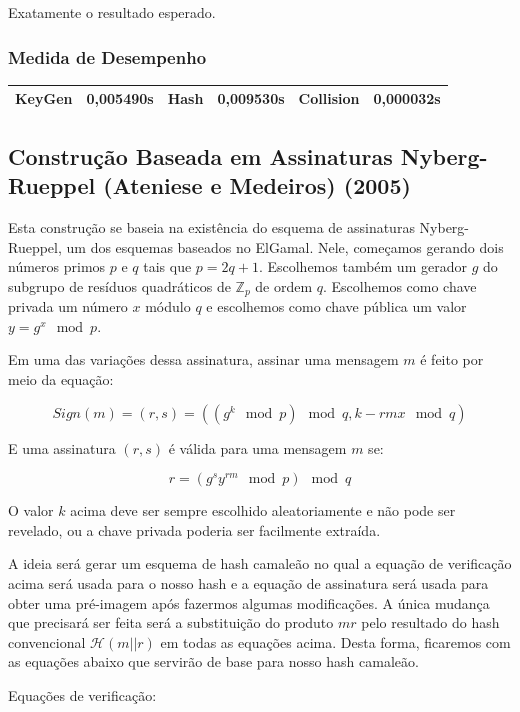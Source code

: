 \documentclass[a4paper]{article}
\begin{document}
Exatamente o resultado esperado.

\subsubsection{Medida de Desempenho}

\begin{center}
\begin{tabular}{|c|c|c|c|c|c|}
  \hline
  KeyGen & 0,005490s & Hash & 0,009530s & Collision & 0,000032s\\
  \hline
\end{tabular}
\end{center}

\subsection{Construção Baseada em Assinaturas  Nyberg-Rueppel
  (Ateniese e Medeiros) (2005)\cite{ateniese}}

Esta construção se baseia na existência do esquema de assinaturas
Nyberg-Rueppel, um dos esquemas baseados no ElGamal. Nele, começamos
gerando dois números primos $p$ e $q$ tais que $p=2q+1$. Escolhemos
também um gerador $g$ do subgrupo de resíduos quadráticos de
$\mathbb{Z}_p$ de ordem $q$. Escolhemos como chave privada um número
$x$ módulo $q$ e escolhemos como chave pública um valor $y=g^x \mod
p$.

Em uma das variações dessa assinatura, assinar uma mensagem $m$ é
feito por meio da equação:

$$
Sign(m) = (r, s) = ((g^k \mod p) \mod q, k-rmx \mod q)
$$

E uma assinatura $(r, s)$ é válida para uma mensagem $m$ se:

$$
r = (g^sy^{rm} \mod p) \mod q
$$

O valor $k$ acima deve ser sempre escolhido aleatoriamente e não pode
ser revelado, ou a chave privada poderia ser facilmente extraída.

A ideia será gerar um esquema de hash camaleão no qual a equação de
verificação acima será usada para o nosso hash e a equação de
assinatura será usada para obter uma pré-imagem após fazermos algumas
modificações. A única mudança que precisará ser feita será a
substituição do produto $mr$ pelo resultado do hash convencional
$\mathcal{H}(m||r)$ em todas as equações acima. Desta forma, ficaremos
com as equações abaixo que servirão de base para nosso hash camaleão.

Equações de verificação:
\end{document}
